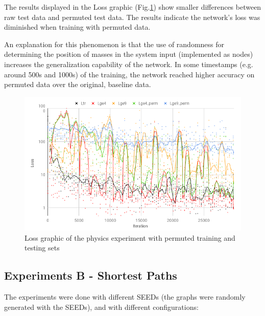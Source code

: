The results displayed in the Loss graphic (Fig.\ref{fig:physics_perm_results}) show smaller differences between raw test data and permuted test data. The results indicate the network’s loss was diminished when training with permuted data.

An explanation for this phenomenon is that the use of randomness for determining the position of masses in the system input (implemented as nodes) increases the generalization capability of the network.
In some timestamps (e.g. around 500s and 1000s) of the training, the network reached higher accuracy on permuted data over the original, baseline data.

\begin{figure}[H]
    \centering
    \includegraphics[width=.9\linewidth]{fig/content/results/physics/physics_perm.png}
    \caption{Loss graphic of the physics experiment with permuted training and testing sets}
    \label{fig:physics_perm_results}
\end{figure}

\subsection{Experiments B - Shortest Paths}

The experiments were done with different SEEDs (the graphs were randomly generated with the SEEDs), and with different configurations:

